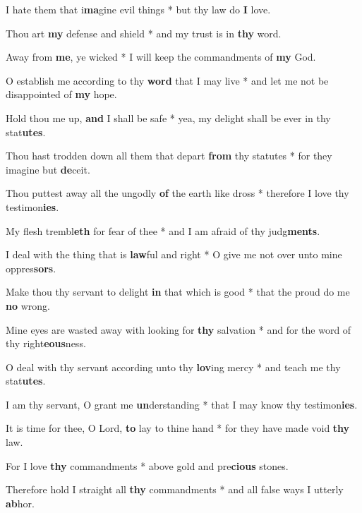 \begin{multicols}{2}
	I hate them that i\textbf{ma}gine evil things * but thy law do \textbf{I} love.
	
	Thou art \textbf{my} defense and shield * and my trust is in \textbf{thy} word.
	
	Away from \textbf{me}, ye wicked * I will keep the commandments of \textbf{my} God.
	
	O establish me according to thy \textbf{word} that I may live * and let me not be disappointed of \textbf{my} hope.
	
	Hold thou me up, \textbf{and} I shall be safe * yea, my delight shall be ever in thy stat\textbf{utes}.
	
	Thou hast trodden down all them that depart \textbf{from} thy statutes * for they imagine but \textbf{de}ceit.
	
	Thou puttest away all the ungodly \textbf{of} the earth like dross * therefore I love thy testimon\textbf{ies}.
	
	My flesh trembl\textbf{eth} for fear of thee * and I am afraid of thy judg\textbf{ments}.
	
	I deal with the thing that is \textbf{law}ful and right * O give me not over unto mine oppres\textbf{sors}.
	
	Make thou thy servant to delight \textbf{in} that which is good * that the proud do me \textbf{no} wrong.
	
	Mine eyes are wasted away with looking for \textbf{thy} salvation * and for the word of thy right\textbf{eous}ness.
	
	O deal with thy servant according unto thy \textbf{lov}ing mercy * and teach me thy stat\textbf{utes}.
	
	I am thy servant, O grant me \textbf{un}derstanding * that I may know thy testimon\textbf{ies}.
	
	It is time for thee, O Lord, \textbf{to} lay to thine hand * for they have made void \textbf{thy} law.
	
	For I love \textbf{thy} commandments * above gold and pre\textbf{cious} stones.
	
	Therefore hold I straight all \textbf{thy} commandments * and all false ways I utterly \textbf{ab}hor. 
\end{multicols}